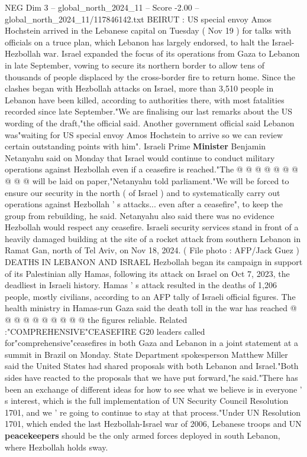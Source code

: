 \begin{textsample}{NEG Dim 3 – global\_north\_2024\_11 – Score -2.00 – global\_north\_2024\_11/117846142.txt}  \label{ex:f3_neg_272}
BEIRUT : US special envoy Amos Hochstein arrived in the Lebanese capital on Tuesday ( Nov 19 ) for talks with officials on a truce plan, which Lebanon has largely endorsed, to halt the Israel-Hezbollah war.
Israel expanded the focus of its operations from Gaza to Lebanon in late September, vowing to secure its northern border to allow tens of thousands of people displaced by the cross-border fire to return home.
Since the clashes began with Hezbollah attacks on Israel, more than 3,510 people in Lebanon have been killed, according to authorities there, with most fatalities recorded since late September."We are finalising our last remarks about the US wording of the draft,"the official said.
Another government official said Lebanon was"waiting for US special envoy Amos Hochstein to arrive so we can review certain outstanding points with him".
Israeli Prime \textbf{Minister} Benjamin Netanyahu said on Monday that Israel would continue to conduct military operations against Hezbollah even if a ceasefire is reached."The @ @ @ @ @ @ @ @ @ @ will be laid on paper,"Netanyahu told parliament."We will be forced to ensure our security in the north ( of Israel ) and to systematically carry out operations against Hezbollah ' s attacks... even after a ceasefire", to keep the group from rebuilding, he said.
Netanyahu also said there was no evidence Hezbollah would respect any ceasefire.
Israeli security services stand in front of a heavily damaged building at the site of a rocket attack from southern Lebanon in Ramat Gan, north of Tel Aviv, on Nov 18, 2024. ( File photo : AFP/Jack Guez ) DEATHS IN LEBANON AND ISRAEL Hezbollah began its campaign in support of its Palestinian ally Hamas, following its attack on Israel on Oct 7, 2023, the deadliest in Israeli history.
Hamas ' s attack resulted in the deaths of 1,206 people, mostly civilians, according to an AFP tally of Israeli official figures.
The health ministry in Hamas-run Gaza said the death toll in the war has reached @ @ @ @ @ @ @ @ @ @ the figures reliable.
Related :"COMPREHENSIVE"CEASEFIRE G20 leaders called for"comprehensive"ceasefires in both Gaza and Lebanon in a joint statement at a summit in Brazil on Monday.
State Department spokesperson Matthew Miller said the United States had shared proposals with both Lebanon and Israel."Both sides have reacted to the proposals that we have put forward,"he said."There has been an exchange of different ideas for how to see what we believe is in everyone ' s interest, which is the full implementation of UN Security Council Resolution 1701, and we ' re going to continue to stay at that process."Under UN Resolution 1701, which ended the last Hezbollah-Israel war of 2006, Lebanese troops and UN \textbf{peacekeepers} should be the only armed forces deployed in south Lebanon, where Hezbollah holds sway.

\end{textsample}
